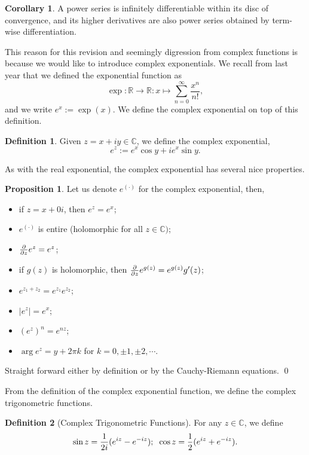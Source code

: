 \documentclass[
]{article}
\theoremstyle{definition}
\newtheorem{prop}{Proposition}
\newtheorem{corollary}{Corollary}[theorem]
\theoremstyle{definition}
\newtheorem{definition}{Definition}[section]
\begin{document}
\begin{corollary}
  A power series is infinitely differentiable within its disc of convergence, and 
  its higher derivatives are also power series obtained by term-wise differentiation.
\end{corollary}

This reason for this revision and seemingly digression from complex
functions is because we would like to introduce complex exponentials. We
recall from last year that we defined the exponential function as
\[\exp : \mathbb{R} \to \mathbb{R} : x \mapsto \sum_{n = 0}^\infty \frac{x^n}{n!},\]
and we write \(e^x := \exp(x)\). We define the complex exponential on
top of this definition.

\begin{definition}
  Given \(z = x + iy \in \mathbb{C}\), we define the complex exponential, 
  \[e^z := e^x \cos y + i e^x \sin y.\]
\end{definition}

As with the real exponential, the complex exponential has several nice
properties.

\begin{prop}
  Let us denote \(e^{(\cdot)}\) for the complex exponential, then, 
  \begin{itemize}
    \item if \(z = x + 0i\), then \(e^z = e^x\);
    \item \(e^{(\cdot)}\) is entire (holomorphic for all \(z \in \mathbb{C})\);
    \item \(\pdv{z}e^z = e^z\);
    \item if \(g(z)\) is holomorphic, then \(\pdv{z}e^{g(z)} = e^{g(z)}g'(z)\);
    \item \(e^{z_1 + z_2} = e^{z_1} e^{z_2}\);
    \item \(\left| e^z \right| = e^x\);
    \item \((e^{z})^n = e^{nz}\);
    \item \(\arg e^z = y + 2\pi k\) for \(k = 0, \pm 1, \pm 2, \cdots\).
  \end{itemize} 
\end{prop}
\proof

Straight forward either by definition or by the Cauchy-Riemann
equations. \qed

From the definition of the complex exponential function, we define the
complex trigonometric functions.

\begin{definition}[Complex Trigonometric Functions]
  For any \(z \in \mathbb{C}\), we define 
  \[\sin z = \frac{1}{2i}(e^{iz} - e^{-iz}); \hspace{2mm} \cos z = \frac{1}{2}(e^{iz} + e^{-iz}).\]
\end{definition}
\end{document}

